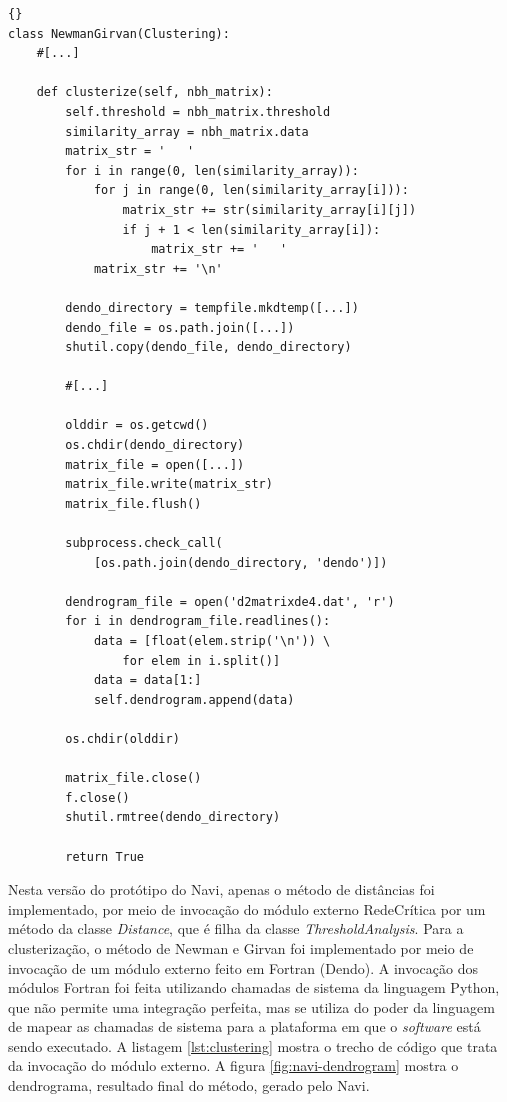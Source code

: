 \lstset{language=python}
\lstset{commentstyle=\textit}
\begin{lstlisting}[frame=trbl, caption=Clusterização usando o método de Newman e Girvan,label=lst:clustering]{}
class NewmanGirvan(Clustering):
    #[...]
        
    def clusterize(self, nbh_matrix):
        self.threshold = nbh_matrix.threshold
        similarity_array = nbh_matrix.data
        matrix_str = '   '
        for i in range(0, len(similarity_array)):
            for j in range(0, len(similarity_array[i])):
                matrix_str += str(similarity_array[i][j])
                if j + 1 < len(similarity_array[i]):
                    matrix_str += '   '
            matrix_str += '\n'
        
        dendo_directory = tempfile.mkdtemp([...])
        dendo_file = os.path.join([...])
        shutil.copy(dendo_file, dendo_directory)
        
        #[...]
        
        olddir = os.getcwd()
        os.chdir(dendo_directory)
        matrix_file = open([...])
        matrix_file.write(matrix_str)
        matrix_file.flush()
        
        subprocess.check_call(
            [os.path.join(dendo_directory, 'dendo')])
        
        dendrogram_file = open('d2matrixde4.dat', 'r')
        for i in dendrogram_file.readlines():
            data = [float(elem.strip('\n')) \
                for elem in i.split()]
            data = data[1:]
            self.dendrogram.append(data)
        
        os.chdir(olddir)
        
        matrix_file.close()
        f.close()
        shutil.rmtree(dendo_directory)
        
        return True
\end{lstlisting}

Nesta versão do protótipo do Navi, apenas o método de distâncias foi implementado, por meio de invocação do módulo externo RedeCrítica por um método da
classe \textit{Distance}, que é filha da classe \textit{ThresholdAnalysis}. Para a clusterização, o método de Newman e Girvan foi implementado por meio
de invocação de um módulo externo feito em Fortran (Dendo). A invocação dos módulos Fortran foi feita utilizando chamadas de sistema da linguagem Python,
que não permite uma integração perfeita, mas se utiliza do poder da linguagem de mapear as chamadas de sistema para a plataforma em que o \textit{software}
está sendo executado. A listagem \ref{lst:clustering} mostra o trecho de código que trata da invocação do módulo externo. A figura \ref{fig:navi-dendrogram}
mostra o dendrograma, resultado final do método, gerado pelo Navi.

